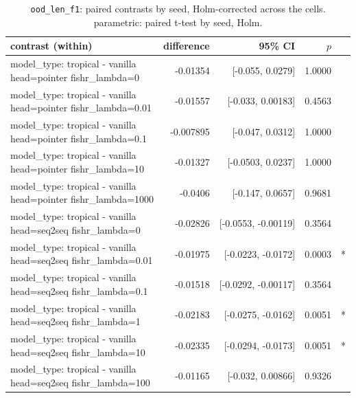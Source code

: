 \documentclass[10pt]{article}
\makeatletter
\newcommand{\stackcell}[1]{\begin{tabular}[t]{@{}l@{}}#1\end{tabular}}
\makeatother
\begin{document}
{\small
\begin{longtable}{lrrrl}
\caption{\texttt{ood\_len\_f1}: paired contrasts by seed, Holm-corrected across the cells. parametric: paired t-test by seed, Holm.}\label{tab:paired-ood_len_f1}\\
\toprule
contrast (within) & difference & 95\% CI & $p$ & \\
\midrule
\endhead
\stackcell{model\_type: tropical - vanilla\\\footnotesize head=pointer fishr\_lambda=0 } & -0.01354 & [-0.055, 0.0279] & 1.0000 & \\
\stackcell{model\_type: tropical - vanilla\\\footnotesize head=pointer fishr\_lambda=0.01 } & -0.01557 & [-0.033, 0.00183] & 0.4563 & \\
\stackcell{model\_type: tropical - vanilla\\\footnotesize head=pointer fishr\_lambda=0.1 } & -0.007895 & [-0.047, 0.0312] & 1.0000 & \\
\stackcell{model\_type: tropical - vanilla\\\footnotesize head=pointer fishr\_lambda=10 } & -0.01327 & [-0.0503, 0.0237] & 1.0000 & \\
\stackcell{model\_type: tropical - vanilla\\\footnotesize head=pointer fishr\_lambda=1000 } & -0.0406 & [-0.147, 0.0657] & 0.9681 & \\
\stackcell{model\_type: tropical - vanilla\\\footnotesize head=seq2seq fishr\_lambda=0 } & -0.02826 & [-0.0553, -0.00119] & 0.3564 & \\
\stackcell{model\_type: tropical - vanilla\\\footnotesize head=seq2seq fishr\_lambda=0.01 } & -0.01975 & [-0.0223, -0.0172] & 0.0003 & *\\
\stackcell{model\_type: tropical - vanilla\\\footnotesize head=seq2seq fishr\_lambda=0.1 } & -0.01518 & [-0.0292, -0.00117] & 0.3564 & \\
\stackcell{model\_type: tropical - vanilla\\\footnotesize head=seq2seq fishr\_lambda=1 } & -0.02183 & [-0.0275, -0.0162] & 0.0051 & *\\
\stackcell{model\_type: tropical - vanilla\\\footnotesize head=seq2seq fishr\_lambda=10 } & -0.02335 & [-0.0294, -0.0173] & 0.0051 & *\\
\stackcell{model\_type: tropical - vanilla\\\footnotesize head=seq2seq fishr\_lambda=100 } & -0.01165 & [-0.032, 0.00866] & 0.9326 & \\

\end{longtable}}
\end{document}
